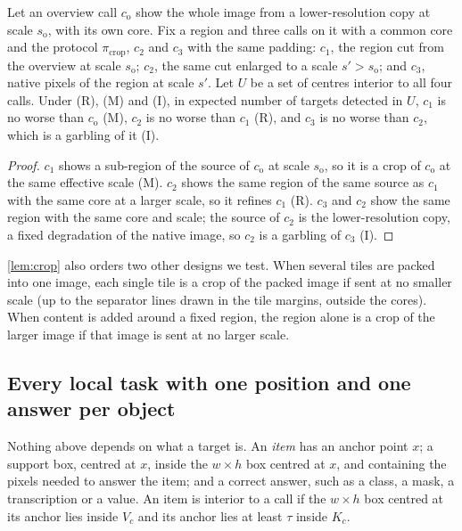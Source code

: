 \begin{proposition}
\label{prop:zoom}
Let an overview call $c_{\mathrm{o}}$ show the whole image from a lower-resolution copy at scale $s_{\mathrm{o}}$, with its own core. Fix a region and three calls on it with a common core and the protocol $\pi_{\mathrm{crop}}$, $c_2$ and $c_3$ with the same padding: $c_1$, the region cut from the overview at scale $s_{\mathrm{o}}$; $c_2$, the same cut enlarged to a scale $s' > s_{\mathrm{o}}$; and $c_3$, native pixels of the region at scale $s'$. Let $U$ be a set of centres interior to all four calls. Under (R), (M) and (I), in expected number of targets detected in $U$, $c_1$ is no worse than $c_{\mathrm{o}}$ (M), $c_2$ is no worse than $c_1$ (R), and $c_3$ is no worse than $c_2$, which is a garbling of it (I).
\end{proposition}

\begin{proof}
$c_1$ shows a sub-region of the source of $c_{\mathrm{o}}$ at scale $s_{\mathrm{o}}$, so it is a crop of $c_{\mathrm{o}}$ at the same effective scale (M). $c_2$ shows the same region of the same source as $c_1$ with the same core at a larger scale, so it refines $c_1$ (R). $c_3$ and $c_2$ show the same region with the same core and scale; the source of $c_2$ is the lower-resolution copy, a fixed degradation of the native image, so $c_2$ is a garbling of $c_3$ (I).
\end{proof}

\cref{lem:crop} also orders two other designs we test. When several tiles are packed into one image, each single tile is a crop of the packed image if sent at no smaller scale (up to the separator lines drawn in the tile margins, outside the cores). When content is added around a fixed region, the region alone is a crop of the larger image if that image is sent at no larger scale.

\subsection{Every local task with one position and one answer per object}
\label{sec:proofs-local}

Nothing above depends on what a target is. An \emph{item} has an anchor point $x$; a support box, centred at $x$, inside the $w \times h$ box centred at $x$, and containing the pixels needed to answer the item; and a correct answer, such as a class, a mask, a transcription or a value. An item is interior to a call if the $w \times h$ box centred at its anchor lies inside $V_c$ and its anchor lies at least $\tau$ inside $K_c$.

